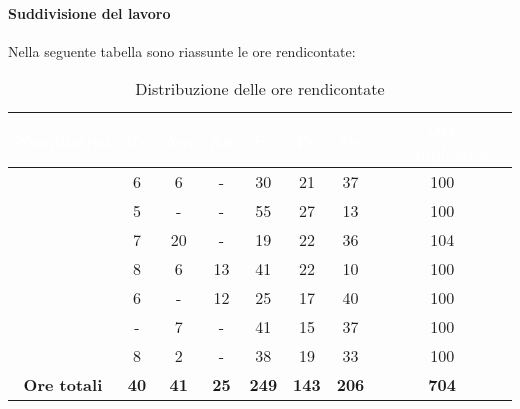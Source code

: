 \paragraph{Suddivisione del lavoro}
Nella seguente tabella sono riassunte le ore rendicontate:
\begin{table}[H]
	\begin{center}
		\begin{tabular}{ c c c c c c c c }
		\rowcolor{darkblue} 
		\textcolor{white}{\textbf{Nominativo}} & \textcolor{white}{\textbf{Re}} & \textcolor{white}{\textbf{Am}} & \textcolor{white}{\textbf{An}} & \textcolor{white}{\textbf{Pt}} & \textcolor{white}{\textbf{Pr}} & \textcolor{white}{\textbf{Ve}} & \textcolor{white}{\textbf{Ore Complessive}} \\ \hline
		\BL & 6  & 6  & - & 30 & 21 & 37 & 100 \\ \hline
		\FF & 5 & - & - & 55 & 27 & 13 & 100 \\ \hline
		\MM & 7  & 20  & - & 19 & 22 & 36  & 104 \\ \hline
		\PC & 8 & 6 & 13 & 41 & 22 & 10 & 100 \\ \hline
		\TG & 6 & - & 12 & 25 & 17 & 40 & 100 \\ \hline
		\TL & - & 7 & - & 41 & 15 & 37 & 100 \\ \hline
		\VD & 8  & 2 & - & 38 & 19 & 33 & 100 \\ \hline
		\textbf{Ore totali} & \textbf{40} & \textbf{41} & \textbf{25} & \textbf{249} & \textbf{143} & \textbf{206} & \textbf{704} \\ \hline
		\end{tabular}
	\caption{Distribuzione delle ore rendicontate}
	\end{center}
\end{table}
